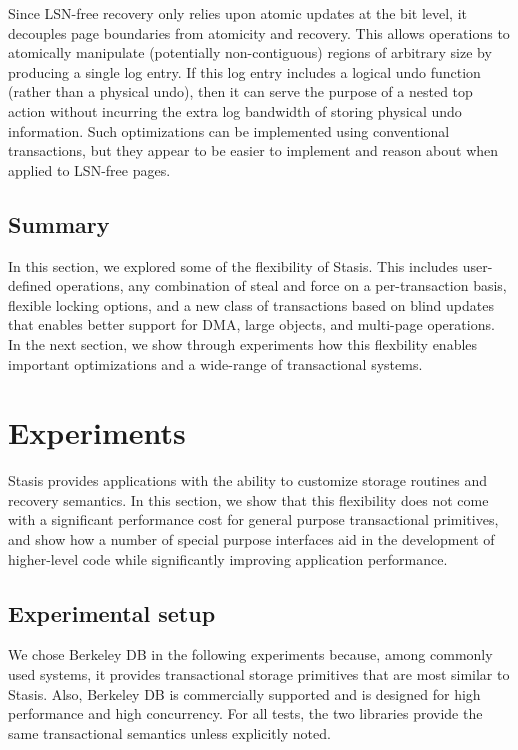 \documentclass[letterpaper,twocolumn,10pt]{article}
\newcommand{\yad}{Stasis\xspace}
\begin{document}
Since LSN-free recovery only relies upon atomic updates at the bit
level, it decouples page boundaries from atomicity and recovery.  This
allows operations to atomically manipulate (potentially
non-contiguous) regions of arbitrary size by producing a single log
entry.  If this log entry includes a logical undo function (rather
than a physical undo), then it can serve the purpose of a nested top
action without incurring the extra log bandwidth of storing physical
undo information.  Such optimizations can be implemented using
conventional transactions, but they appear to be easier to implement
and reason about when applied to LSN-free pages.

\subsection{Summary}

In this section, we explored some of the flexibility of \yad. This
includes user-defined operations, any combination of steal and force on
a per-transaction basis, flexible locking options, and a new class of
transactions based on blind updates that enables better support for
DMA, large objects, and multi-page operations.  In the next section,
we show through experiments how this flexbility enables important
optimizations and a wide-range of transactional systems.




\section{Experiments}
\label{experiments}

\yad provides applications with the ability to customize storage
routines and recovery semantics.  In this section, we show that this
flexibility does not come with a significant performance cost for
general purpose transactional primitives, and show how a number of
special purpose interfaces aid in the development of higher-level 
code while significantly improving application performance.

\subsection{Experimental setup}
\label{sec:experimental_setup}

We chose Berkeley DB in the following experiments because, among
commonly used systems, it provides transactional storage primitives
that are most similar to \yad.  Also, Berkeley DB is 
commercially supported and is designed for high performance and high
concurrency.  For all tests, the two libraries provide the same
transactional semantics unless explicitly noted.
\end{document}
